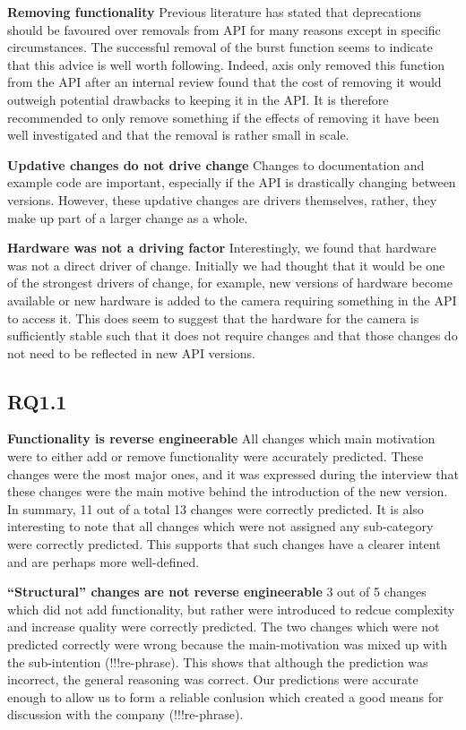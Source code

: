\documentclass{sig-alternate}
\begin{document}
\smallskip \noindent
\textbf{Removing functionality  }
Previous literature has stated that deprecations should be favoured over removals from API for many reasons except in specific circumstances. The successful removal of the burst function seems to indicate that this advice is well worth following. Indeed, axis only removed this function from the API after an internal review found that the cost of removing it would outweigh potential drawbacks to keeping it in the API. It is therefore recommended to only remove something if the effects of removing it have been well investigated and that the removal is rather small in scale.  

\smallskip \noindent
\textbf{Updative changes do not drive change  }
Changes to documentation and example code are important, especially if the API is drastically changing between versions. However, these updative changes are drivers themselves, rather, they make up part of a larger change as a whole. 

\smallskip \noindent
\textbf{Hardware was not a driving factor  }
Interestingly, we found that hardware was not a direct driver of change. Initially we had thought that it would be one of the strongest drivers of change, for example, new versions of hardware become available or new hardware is added to the camera requiring something in the API to access it. This does seem to suggest that the hardware for the camera is sufficiently stable such that it does not require changes and that those changes do not need to be reflected in new API versions.

\subsection{RQ1.1}



\noindent
\textbf{Functionality is reverse engineerable  } 
All changes which main motivation were to either add or remove functionality were accurately predicted. These changes were the most major ones, and it was expressed during the interview that these changes were the main motive behind the introduction of the new version. In summary, 11 out of a total 13 changes were correctly predicted. It is also interesting to note that all changes which were not assigned any sub-category were correctly predicted. This supports that such changes have a clearer intent and are perhaps more well-defined. 

\smallskip \noindent
\textbf{``Structural'' changes are not reverse engineerable  }
3 out of 5 changes which did not add functionality, but rather were introduced to redcue complexity and increase quality were correctly predicted. The two changes which were not predicted correctly were wrong because the main-motivation was mixed up with the sub-intention (!!!re-phrase). This shows that although the prediction was incorrect, the general reasoning was correct. Our predictions were accurate enough to allow us to form a reliable conlusion which created a good means for discussion with the company (!!!re-phrase). 
\end{document}
